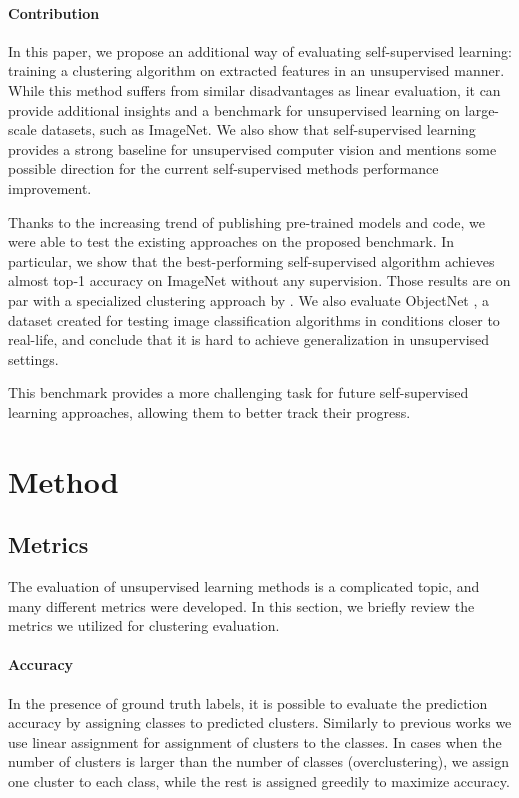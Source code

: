 \documentclass[runningheads]{llncs}
\renewcommand{\cite}[1]{\citep{#1}}
\begin{document}
\paragraph{Contribution}
In this paper, we propose an additional way of evaluating self-supervised learning: training a clustering algorithm on extracted features in an unsupervised manner. While this method suffers from similar disadvantages as linear evaluation, it can provide additional insights and a benchmark for unsupervised learning on large-scale datasets, such as ImageNet.  We also show that self-supervised learning provides a strong baseline for unsupervised computer vision and mentions some possible direction for the current self-supervised methods performance improvement.

Thanks to the increasing trend of publishing pre-trained models and code, we were able to test the existing approaches on the proposed benchmark. In particular, we show that the best-performing self-supervised algorithm achieves almost  top-1 accuracy on ImageNet without any supervision. Those results are on par with a specialized clustering approach by \citet{gansbeke2020scan}. We also evaluate ObjectNet \cite{barbu2019objectnet}, a dataset created for testing image classification algorithms in conditions closer to real-life, and conclude that it is hard to achieve generalization in unsupervised settings. 

This benchmark provides a more challenging task for future self-supervised learning approaches, allowing them to better track their progress.  \section {Method}
\label{sec:method}
\subsection{Metrics}
The evaluation of unsupervised learning methods is a complicated topic, and many different metrics were developed. In this section, we briefly review the metrics we utilized for clustering evaluation.
\paragraph{Accuracy}
In the presence of ground truth labels, it is possible to evaluate the prediction accuracy by assigning classes to predicted clusters. 
Similarly to previous works \cite{xie2015dec,jiang2016variational,gansbeke2020scan} we use linear assignment \cite{kuhn1955hungarian,crouse2016implementing} for assignment of clusters to the classes. In cases when the number of clusters is larger than the number of classes (overclustering), we assign one cluster to each class, while the rest is assigned greedily to maximize accuracy.
\end{document}

